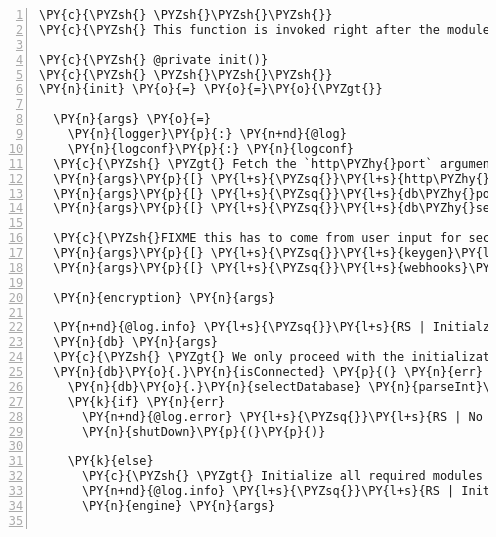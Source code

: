 \begin{Verbatim}[fontsize=\scriptsize,commandchars=\\\{\},numbers=left,firstnumber=1,stepnumber=1]
\PY{c}{\PYZsh{} \PYZsh{}\PYZsh{}\PYZsh{}}
\PY{c}{\PYZsh{} This function is invoked right after the module is loaded and starts the server.}

\PY{c}{\PYZsh{} @private init()}
\PY{c}{\PYZsh{} \PYZsh{}\PYZsh{}\PYZsh{}}
\PY{n}{init} \PY{o}{=} \PY{o}{=}\PY{o}{\PYZgt{}}

  \PY{n}{args} \PY{o}{=}
    \PY{n}{logger}\PY{p}{:} \PY{n+nd}{@log}
    \PY{n}{logconf}\PY{p}{:} \PY{n}{logconf}
  \PY{c}{\PYZsh{} \PYZgt{} Fetch the `http\PYZhy{}port` argument}
  \PY{n}{args}\PY{p}{[} \PY{l+s}{\PYZsq{}}\PY{l+s}{http\PYZhy{}port}\PY{l+s}{\PYZsq{}} \PY{p}{]} \PY{o}{=} \PY{n}{parseInt} \PY{n}{argv}\PY{o}{.}\PY{n}{w} \PY{o}{|}\PY{o}{|} \PY{n}{conf}\PY{o}{.}\PY{n}{getHttpPort}\PY{p}{(}\PY{p}{)}
  \PY{n}{args}\PY{p}{[} \PY{l+s}{\PYZsq{}}\PY{l+s}{db\PYZhy{}port}\PY{l+s}{\PYZsq{}} \PY{p}{]} \PY{o}{=} \PY{n}{parseInt} \PY{n}{argv}\PY{o}{.}\PY{n}{d} \PY{o}{|}\PY{o}{|} \PY{n}{conf}\PY{o}{.}\PY{n}{getDbPort}\PY{p}{(}\PY{p}{)}
  \PY{n}{args}\PY{p}{[} \PY{l+s}{\PYZsq{}}\PY{l+s}{db\PYZhy{}select}\PY{l+s}{\PYZsq{}} \PY{p}{]} \PY{o}{=} \PY{n}{parseInt} \PY{n}{argv}\PY{o}{.}\PY{n}{s} \PY{o}{|}\PY{o}{|} \PY{n}{conf}\PY{o}{.}\PY{n}{fetchProp} \PY{l+s}{\PYZsq{}}\PY{l+s}{db\PYZhy{}select}\PY{l+s}{\PYZsq{}}

  \PY{c}{\PYZsh{}FIXME this has to come from user input for security reasons:}
  \PY{n}{args}\PY{p}{[} \PY{l+s}{\PYZsq{}}\PY{l+s}{keygen}\PY{l+s}{\PYZsq{}} \PY{p}{]} \PY{o}{=} \PY{n}{conf}\PY{o}{.}\PY{n}{getKeygenPassphrase}\PY{p}{(}\PY{p}{)}
  \PY{n}{args}\PY{p}{[} \PY{l+s}{\PYZsq{}}\PY{l+s}{webhooks}\PY{l+s}{\PYZsq{}} \PY{p}{]} \PY{o}{=} \PY{n}{conf}\PY{o}{.}\PY{n}{fetchProp} \PY{l+s}{\PYZsq{}}\PY{l+s}{webhooks}\PY{l+s}{\PYZsq{}}

  \PY{n}{encryption} \PY{n}{args}
  
  \PY{n+nd}{@log.info} \PY{l+s}{\PYZsq{}}\PY{l+s}{RS | Initialzing DB}\PY{l+s}{\PYZsq{}}
  \PY{n}{db} \PY{n}{args}
  \PY{c}{\PYZsh{} \PYZgt{} We only proceed with the initialization if the DB is ready}
  \PY{n}{db}\PY{o}{.}\PY{n}{isConnected} \PY{p}{(} \PY{n}{err} \PY{p}{)} \PY{o}{=}\PY{o}{\PYZgt{}}
    \PY{n}{db}\PY{o}{.}\PY{n}{selectDatabase} \PY{n}{parseInt}\PY{p}{(} \PY{n}{args}\PY{p}{[} \PY{l+s}{\PYZsq{}}\PY{l+s}{db\PYZhy{}select}\PY{l+s}{\PYZsq{}} \PY{p}{]} \PY{p}{)} \PY{o}{|}\PY{o}{|} \PY{l+m+mi}{0}
    \PY{k}{if} \PY{n}{err}
      \PY{n+nd}{@log.error} \PY{l+s}{\PYZsq{}}\PY{l+s}{RS | No DB connection, shutting down system!}\PY{l+s}{\PYZsq{}}
      \PY{n}{shutDown}\PY{p}{(}\PY{p}{)}

    \PY{k}{else}
      \PY{c}{\PYZsh{} \PYZgt{} Initialize all required modules with the args object.}
      \PY{n+nd}{@log.info} \PY{l+s}{\PYZsq{}}\PY{l+s}{RS | Initialzing engine}\PY{l+s}{\PYZsq{}}
      \PY{n}{engine} \PY{n}{args}
      

\end{Verbatim}

